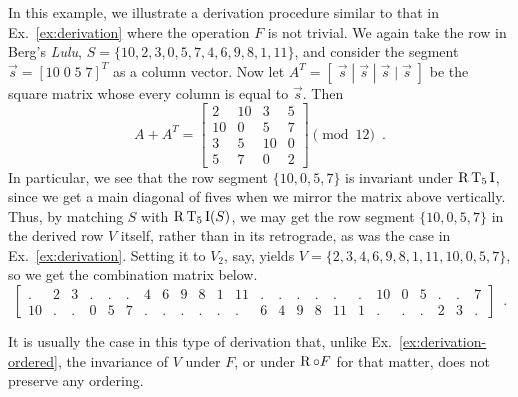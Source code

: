 \begin{example}
    \label{ex:derivation-ordered}
    In this example, we illustrate a derivation procedure similar to that in Ex.~\ref{ex:derivation} where the operation $F$ is not trivial. We again take the row in Berg's \emph{Lulu}, $S = \{ 10, 2, 3, 0, 5, 7, 4, 6, 9, 8, 1, 11 \}$, and consider the segment $\vec{s} = [10 \; 0 \; 5 \; 7]^T$ as a column vector. Now let $A^T = [\;\vec{s} \; | \; \vec{s} \; | \; \vec{s} \; | \; \vec{s}\;]$ be the square matrix whose every column is equal to $\vec{s}$. Then
	\begin{equation}
    	A + A^T = \begin{bmatrix}
    		2 & 10 & 3 & 5 \\
        	10 & 0 & 5 & 7 \\
        	3 & 5 & 10 & 0 \\
        	5 & 7 & 0 & 2
        \end{bmatrix} \pmod{12} \enspace.
	\end{equation}
	\noindent In particular, we see that the row segment $\{ 10, 0, 5, 7 \}$ is invariant under $\operatorname{R}\operatorname{T}_5\operatorname{I}$, since we get a main diagonal of fives when we mirror the matrix above vertically. Thus, by matching $S$ with $\operatorname{R}\operatorname{T}_5\operatorname{I}(S)$, we may get the row segment $\{ 10, 0, 5, 7 \}$ in the derived row $V$ itself, rather than in its retrograde, as was the case in Ex.~\ref{ex:derivation}. Setting it to $V_2$, say, yields $V = \{ 2, 3, 4, 6, 9, 8, 1, 11, 10, 0, 5, 7 \}$, so we get the combination matrix below.
	\begin{equation}
    	\left[
    	\begin{array}{cccccccccccc|cccccccccccc}
        	. & 2 & 3 & . & . & . & 4 & 6 & 9 & 8 & 1 & 11 & . & . & . & . & . & . & 10 & 0 & 5 & . & . & 7 \\
        	10 & . & . & 0 & 5 & 7 & . & . & . & . & . & . & 6 & 4 & 9 & 8 & 11 & 1 & . & . & . & 2 & 3 & .
    	\end{array}
    	\right] \enspace.
	\end{equation}
\end{example}

It is usually the case in this type of derivation that, unlike Ex.~\ref{ex:derivation-ordered}, the invariance of $V$ under $F$, or under $\operatorname{R} \circ F$ for that matter, does not preserve any ordering.

